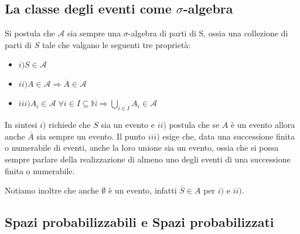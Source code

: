 \subsection{La classe degli eventi come $\sigma$-algebra}

\begin{flushleft}

Si postula che $\mathcal{A}$ sia sempre una $\sigma$-algebra di parti di S, ossia una 
collezione di parti di $S$ tale che valgano le seguenti tre proprietà:

\begin{itemize}
\item{$i) S \in \mathcal{A}$}
\item{$ii) A \in \mathcal{A} \Rightarrow \overline{A} \in \mathcal{A}$}
\item{$iii) A_i \in \mathcal{A} \; \forall i \in I \subseteq \mathbb{N} \Rightarrow 
\bigcup_{i \in I} A_i \in \mathcal{A}$}
\end{itemize}

In sintesi $i)$ richiede che $S$ sia un evento e $ii)$ postula che se $A$ è un evento allora 
anche $\overline{A}$ sia sempre un evento. Il punto $iii)$ esige che, data una successione 
finita o numerabile di eventi, anche la loro unione sia un evento, ossia che si possa sempre
parlare della realizzazione di almeno uno degli eventi di una successione finita o numerabile.

Notiamo inoltre che anche $\emptyset$ è un evento, infatti $\overline{S} \in A$ per $i)$ e 
$ii)$.

\end{flushleft}

\subsection{Spazi probabilizzabili e Spazi probabilizzati}

